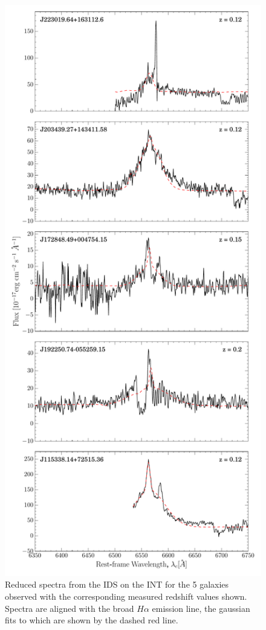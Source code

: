 {\begin{figure}
\centering
\includegraphics[height=0.9 \textheight]{agn/int_zoom_spectra.pdf}
\caption[Zoom in on $H\alpha$ region of the spectra of 5 galaxies observed with the IDS on the INT]{Reduced spectra from the IDS on the INT for the 5 galaxies observed with the corresponding measured redshift values shown. Spectra are aligned with the broad $H\alpha$ emission line, the gaussian fits to which are shown by the dashed red line.  }
\label{fig:zoomspectra}
\end{figure}

}
